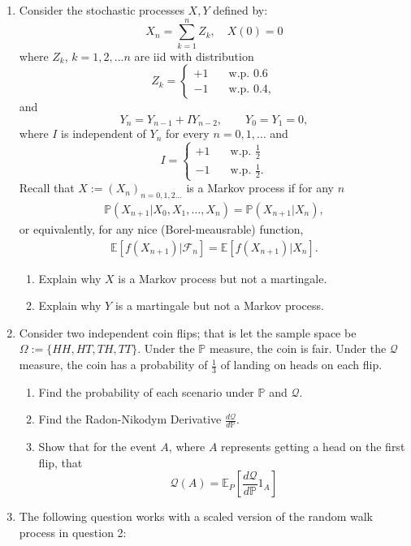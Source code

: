 \documentclass[11pt]{article}
\newcommand{\E}{\mathbb{E}}
\newcommand{\PR}{\mathbb{P}}
\renewcommand{\Pr}{\mathbb{P}}
\newcommand{\Q}{\mathcal{Q}}
\begin{document}
\begin{enumerate}
		\item Consider the stochastic processes \( X, Y \) defined by:
		\[	X_n = \sum_{k=1}^{n}Z_{k},\quad X(0) = 0
		\]
		where $Z_{k}$, $k=1,2,...n$ are iid with distribution 
		\[	Z_{k} = \begin{cases}
			+1 &  \quad \text{w.p. } 0.6 \\
			-1 & \quad \text{w.p. } 0.4,
		\end{cases}
		\]
		and 
		\[
		Y_n = Y_{n-1} + IY_{n-2},\qquad Y_0 = Y_1 = 0,
		\]
		where \( I \) is independent of \( Y_n \) for every \( n=0,1,\ldots \) and 
		\[
		I = \begin{cases}
			+1 &  \quad \text{w.p. } \frac{1}{2} \\
			-1 & \quad \text{w.p. } \frac{1}{2}.
		\end{cases}
		\]
		Recall that \( X:=(X_n)_{n=0,1,2\ldots} \) is a Markov process if for any \( n \)
		\begin{align*}
			\Pr(X_{n+1}| X_0, X_1, \ldots, X_n) = \Pr(X_{n+1} | X_n),
		\end{align*}
		or equivalently, for any nice (Borel-meausrable) function,
		\begin{align*}
			\E[f(X_{n+1})|\mathcal{F}_n] = \E[f(X_{n+1}) | X_n].
		\end{align*}
		\begin{enumerate}
			\item Explain why \( X \) is a Markov process but not a martingale.
			\item Explain why \( Y \) is a martingale but not a Markov process.
		\end{enumerate}
		\item Consider two independent coin flips; that is let the sample space be $\Omega:=\{HH, HT, TH, TT\}$. Under the $\PR$ measure, the coin is fair. Under the $\Q$ measure, the coin has a probability of $\frac{1}{3}$ of landing on heads on each flip. 
		\begin{enumerate}
			\item Find the probability of each scenario under $\PR$ and $\Q$.
			\item Find the Radon-Nikodym Derivative $\frac{d\Q}{d\PR}$.
			\item Show that for the event $A$, where $A$ represents getting a head on the first flip, that
			\[	\Q(A) = \E_{P}\left[\frac{d\Q}{d\PR}1_{A}\right]
			\]
		\end{enumerate}
		\item The following question works with a scaled version of the random walk process in question 2:

\end{enumerate}
\end{document}
